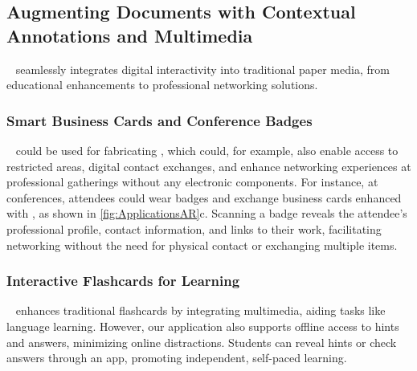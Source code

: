 \subsection{Augmenting Documents with Contextual Annotations and Multimedia}
\systemName~ seamlessly integrates digital interactivity into traditional paper media,  from educational enhancements to professional networking solutions.




\subsubsection{Smart Business Cards and Conference Badges}
\systemName~ could be used for fabricating , which could, for example, also enable access to restricted areas, digital contact exchanges, and enhance networking experiences at professional gatherings without any electronic components.
For instance, at conferences, attendees could wear badges and exchange business cards enhanced with \systemName, as shown in \autoref{fig:ApplicationsAR}c. Scanning a badge reveals the attendee's professional profile, contact information, and links to their work, facilitating networking without the need for physical contact or exchanging multiple items.



\subsubsection{Interactive Flashcards for Learning}

\systemName~ enhances traditional flashcards by integrating multimedia, aiding tasks like language learning.
However, our application also supports offline access to hints and answers, minimizing online distractions. Students can reveal hints or check answers through an app, promoting independent, self-paced learning. 




